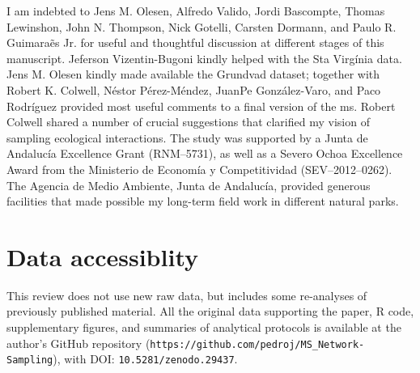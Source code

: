 \documentclass[12pt]{article}
\begin{document}
I am indebted to Jens M. Olesen, Alfredo Valido, Jordi Bascompte, Thomas Lewinshon, John N. Thompson, Nick Gotelli, Carsten Dormann, and Paulo R. Guimara\~es Jr. for useful and thoughtful discussion at different stages of this manuscript. Jeferson Vizentin-Bugoni kindly helped with the Sta Virg\'inia data. Jens M. Olesen kindly made available the Grundvad dataset; together with Robert K. Colwell, N\'estor P\'erez-M\'endez, JuanPe Gonz\'alez-Varo, and Paco Rodr\'iguez provided most useful comments to a final version of the ms. Robert Colwell shared a number of crucial suggestions that clarified my vision of sampling ecological interactions. The study was supported by a Junta de Andaluc\'ia Excellence Grant (RNM--5731), as well as a Severo Ochoa Excellence Award from the Ministerio de Econom\'ia y Competitividad (SEV--2012--0262). The Agencia de Medio Ambiente, Junta de Andaluc\'ia, provided generous facilities that made possible my long-term field work in different natural parks.
\section*{Data accessiblity}
This review does not use new raw data, but includes some re-analyses of previously published material. All the original data supporting the paper, R code, supplementary figures, and summaries of analytical protocols is available at the author's GitHub repository (\texttt{https://github.com/pedroj/MS\_Network-Sampling}), with DOI: \texttt{10.5281/zenodo.29437}.
\newpage
\end{document}
